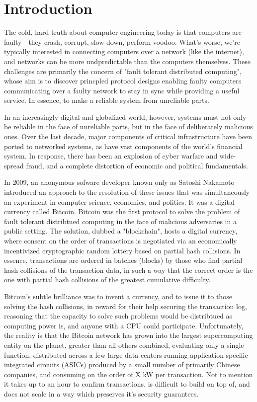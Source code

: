 \chapter{Introduction}

The cold, hard truth about computer engineering today is that computers are faulty - 
they crash, corrupt, slow down, perform voodoo. 
What's worse, we're typically interested in connecting computers over a network (like the internet),
and networks can be more undpredictable than the computers themselves.
These challenges are primarily the concern of "fault tolerant distributed computing",
whose aim is to discover princpled protocol designs enabling faulty computers communicating over a faulty network 
to stay in sync while providing a useful service.
In essence, to make a reliable system from unreliable parts.

In an increasingly digital and globalized world, however, 
systems must not only be reliable in the face of unreliable parts, but in the face of deliberately malicious ones.
Over the last decade, major components of critical infrastructure have been ported to networked systems,
as have vast components of the world's financial system.
In response, there has been an explosion of cyber warfare and wide-spread fraud,
and a complete distortion of economic and political fundamentals.

In 2009, an anonymous sofware developer known only as Satoshi Nakamoto introduced an approach to the resolution of these issues that was simultaneously an experiment in computer science, 
economics, and politics. 
It was a digital currency called Bitcoin.
Bitcoin was the first protocol to solve the problem of fault tolerant distribtued computing in the face of malicious adversaries in a public setting.
The solution, dubbed a "blockchain", hosts a digital currency, 
where consent on the order of transactions is negotiated via an economically incentivized cryptographic random lottery based on partial hash collisions.
In essence, transactions are ordered in batches (blocks) by those who find partial hash collisions of the transaction data, 
in such a way that the correct order is the one with partial hash collisions of the greatest cumulative difficulty.

Bitcoin's subtle brilliance was to invent a currency, and to issue it to those solving the hash collisions, in reward for their help securing the transaction log,
reasoning that the capacity to solve such problems would be distribtued as computing power is, and anyone with a CPU could participate.
Unfortunately, the reality is that the Bitcoin network has grown into the largest supercomputing entity on the planet, greater than all others combined,
evaluating only a single function, distributed across a few large data centers running application specific integrated circuits (ASICs) produced by a small number of primarily Chinese companies, and consuming on the order of X kW per transaction.
Not to mention it takes up to an hour to confirm transactions, is difficult to build on top of, and does not scale in a way which preserves it's security guarantees.


